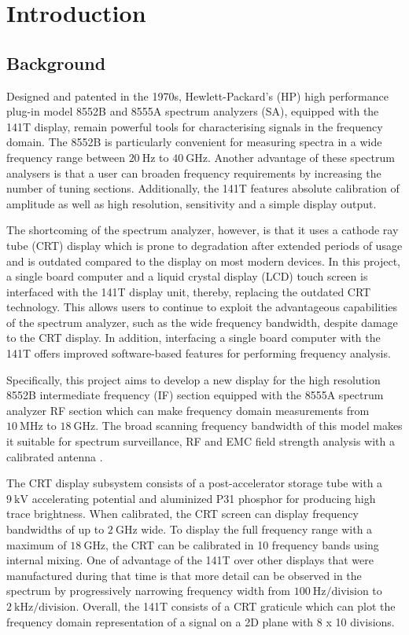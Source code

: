 \documentclass[class=report,11pt,crop=false]{standalone}
\begin{document}
\chapter{Introduction}

\section{Background}
Designed and patented in the 1970s, Hewlett-Packard's (HP) high performance plug-in model 8552B and 8555A spectrum analyzers (SA), equipped with the 141T display, remain powerful tools for characterising signals in the frequency domain. The 8552B is particularly convenient for measuring spectra in a wide frequency range between $\SI{20}{\hertz}$ to $\SI{40}{\giga\hertz}$. Another advantage of these spectrum analysers is that a user can broaden frequency requirements by increasing the number of tuning sections. Additionally, the 141T features absolute calibration of amplitude as well as high resolution, sensitivity and a simple display output.  

The shortcoming of the spectrum analyzer, however, is that it uses a cathode ray tube (CRT) display which is prone to degradation after extended periods of usage and is outdated compared to the display on most modern devices. In this project, a single board computer and a liquid crystal display (LCD) touch screen is interfaced with the 141T display unit, thereby, replacing the outdated CRT technology. This allows users to continue to exploit the advantageous capabilities of the spectrum analyzer, such as the wide frequency bandwidth, despite damage to the CRT display. In addition, interfacing a single board computer with the 141T offers improved software-based features for performing frequency analysis.

Specifically, this project aims to develop a new display for the high resolution 8552B intermediate frequency (IF) section equipped with the 8555A spectrum analyzer RF section which can make frequency domain measurements from $\SI{10}{\mega\hertz}$ to $\SI{18}{\giga\hertz}$. The broad scanning frequency bandwidth of this model makes it suitable for spectrum surveillance, RF and EMC field strength analysis with a calibrated antenna \cite{HP}. 

The CRT display subsystem consists of a post-accelerator storage tube with a $\SI{9}{\kilo\volt}$ accelerating potential and aluminized P31 phosphor for producing high trace brightness. When calibrated, the CRT screen can display frequency bandwidths of up to $\SI{2}{\giga\hertz}$ wide. To display the full frequency range with a maximum of $\SI{18}{\giga\hertz}$, the CRT can be calibrated in 10 frequency bands using internal mixing. One of advantage of the 141T over other displays that were manufactured during that time is that more detail can be observed in the spectrum by progressively narrowing frequency width from $\SI{100}{\hertz}/\text{division}$ to $\SI{2}{\kilo\hertz}/\text{division}$. Overall, the 141T consists of a CRT graticule which can plot the frequency domain representation of a signal on a 2D plane with 8 x 10 divisions. 
\end{document}
